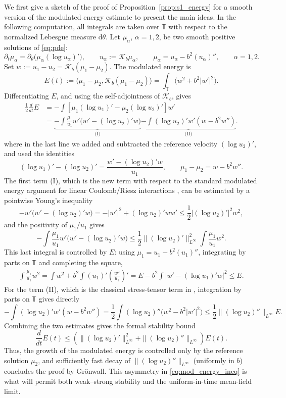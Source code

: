 \documentclass[11pt]{article}
\theoremstyle{definition}
\newcommand{\Torus}{\mathbb{T}}
\def\Kb{\mathcal K_b}
\begin{document}
We first give a sketch of the proof of Proposition~\ref{prop:s1_energy} for a smooth version of the modulated energy estimate to present the main ideas. In the following computation, all integrals are taken over $\Torus$ with respect to the normalized Lebesgue measure $\mathrm d\theta$. Let
\(\mu_\alpha\), \(\alpha=1,2\), be two smooth positive solutions of \eqref{eq:pde}:
\[
\partial_t\mu_\alpha
=
\partial_\theta\bigl(\mu_\alpha(\log u_\alpha)'\bigr),
\qquad
u_\alpha:=\Kb\mu_\alpha,
\qquad
\mu_\alpha=u_\alpha-b^2(u_\alpha)'',
\qquad \alpha=1,2.
\]
Set \(w:=u_1-u_2=\Kb(\mu_1-\mu_2)\). The modulated energy is
\[
E(t)
:=
\langle \mu_1-\mu_2,\Kb(\mu_1-\mu_2)\rangle
=
\int_{\Torus}\bigl(w^2+b^2|w'|^2\bigr).
\]
Differentiating \(E\), and using the self-adjointness of \(\Kb\), gives
\[
\begin{aligned}
\frac12\frac{d}{dt}E
&=
-\int
\left[
\mu_1(\log u_1)'-\mu_2(\log u_2)'
\right]w' \\
&=
\underbrace{
-\int \frac{\mu_1}{u_1}w'
\bigl(w'-(\log u_2)'w\bigr)
}_{\text{(I)}}
\underbrace{
-\int(\log u_2)'w'(w-b^2w'')
}_{\text{(II)}}.
\end{aligned}
\]
where in the last line we added and subtracted the reference velocity \((\log u_2)'\), and used the identities
\[
(\log u_1)'-(\log u_2)'=
\frac{w'-(\log u_2)'w}{u_1},
\qquad
\mu_1-\mu_2=w-b^2w''.
\]
The first term (I), which is the new term with respect to the
standard modulated energy argument for linear Coulomb/Riesz interactions
\cite{serfaty2017mean,duerinckx_serfaty_2020}, can be estimated by a
pointwise Young's inequality
\[
-w'\bigl(w'-(\log u_2)'w\bigr)
=-|w'|^2+(\log u_2)'ww'
\le \frac12 |(\log u_2)'|^2w^2,
\]
and the positivity of \(\mu_1/u_1\) gives
\[
-\int \frac{\mu_1}{u_1}w'
\bigl(w'-(\log u_2)'w\bigr)
\le
\frac12\|(\log u_2)'\|_{L^\infty}^2
\int\frac{\mu_1}{u_1}w^2 .
\]
This last integral is controlled by \(E\):  using \(\mu_1=u_1-b^2(u_1)''\), integrating by parts on
\(\Torus\) and completing the square,
\[
\begin{aligned}
\int\frac{\mu_1}{u_1}w^2
=
\int w^2+b^2\int (u_1)'
\left(\frac{w^2}{u_1}\right)'
=
E
-
b^2\int
\left|w'-(\log u_1)'w\right|^2
\le E.
\end{aligned}
\]
For the term (II), which is the classical stress-tensor term
in
\cite{serfaty2017mean,duerinckx_serfaty_2020}, integration by parts on \(\Torus\) gives directly
\[
-\int(\log u_2)'w'(w-b^2w'')
=
\frac12\int(\log u_2)''\bigl(w^2-b^2|w'|^2\bigr)
\le
\frac12\|(\log u_2)''\|_{L^\infty}E.
\]
Combining the two estimates gives the formal stability bound
\begin{equation}
\label{eq:mod_energy_ineq}
\frac{d}{dt}E(t)
\le
\left(
\|(\log u_2)'\|_{L^\infty}^2
+
\|(\log u_2)''\|_{L^\infty}
\right)E(t).
\end{equation}
Thus, the growth of the modulated energy is controlled only by the reference solution $\mu_2$, and sufficiently fast decay of $\|(\log u_2)''\|_{L^\infty}$ (uniformly in $b$) concludes the proof by Grönwall. This asymmetry in \eqref{eq:mod_energy_ineq} is what will permit both weak–strong stability and the uniform-in-time mean-field limit. 
\end{document}

